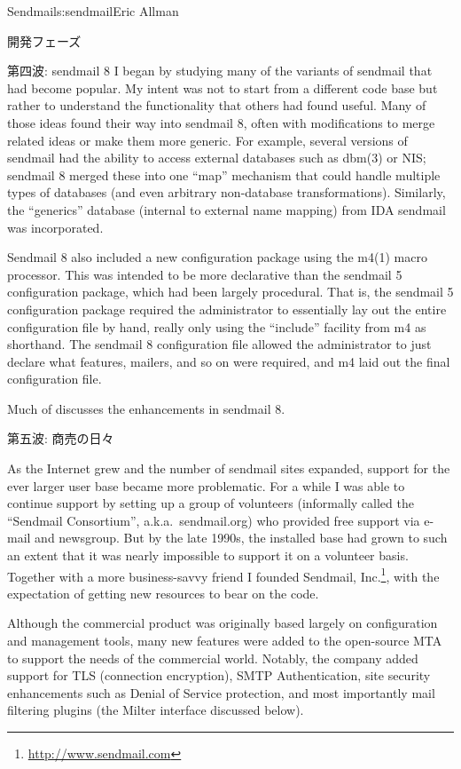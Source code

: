 \begin{aosachapter}{Sendmail}{s:sendmail}{Eric Allman}
\begin{aosasect1}{開発フェーズ}
\begin{aosasect2}{第四波: sendmail 8}
I began by studying many of the variants of sendmail that had become
popular.  My intent was not to start from a different code base but
rather to understand the functionality that others had found useful.
Many of those ideas found their way into sendmail 8, often with
modifications to merge related ideas or make them more generic. For
example, several versions of sendmail had the ability to access
external databases such as dbm(3) or NIS; sendmail 8 merged these into
one ``map'' mechanism that could handle multiple types of databases
(and even arbitrary non-database transformations).  Similarly, the
``generics'' database (internal to external name mapping)
from IDA sendmail was incorporated.

Sendmail 8 also included a new configuration package using the m4(1)
macro processor.
This was
intended to be more declarative than the sendmail 5 configuration
package, which had been largely procedural. That is, the sendmail 5
configuration package required the administrator to essentially lay
out the entire configuration file by hand, really only using the
``include'' facility from m4 as shorthand. The sendmail 8
configuration file allowed the administrator to just declare what
features, mailers, and so on were required, and m4 laid out the final
configuration file.

Much of  discusses the enhancements in
sendmail 8.

\end{aosasect2}

\begin{aosasect2}{第五波: 商売の日々}

As the Internet grew and the number of sendmail sites expanded,
support for the ever larger user base became more problematic.  For a
while I was able to continue support by setting up a group of
volunteers (informally called the ``Sendmail Consortium'',
a.k.a.\ sendmail.org) who provided free support via e-mail and
newsgroup.  But by the late 1990s, the installed base had grown to such
an extent that it was nearly impossible to support it on a volunteer
basis.  Together with a more business-savvy friend I founded Sendmail,
Inc.\footnote{\url{http://www.sendmail.com}},
with the expectation of getting new resources to bear on the
code.

Although the commercial product was originally based largely on
configuration and management tools, many new features were added to
the open-source MTA to support the needs of the commercial world.
Notably, the company added support for TLS (connection encryption),
SMTP Authentication, site security enhancements such as Denial of
Service protection, and most importantly mail filtering plugins (the
Milter interface discussed below).


\end{aosasect2}
\end{aosasect1}
\end{aosachapter}
